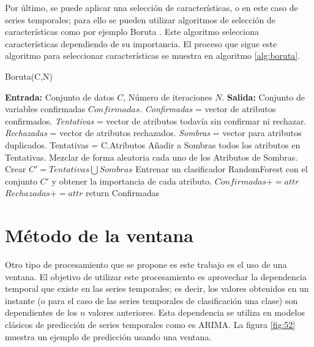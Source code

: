 Por último, se puede aplicar una selección de características, o en este caso de series temporales; para ello se pueden utilizar algoritmos de selección de características como por ejemplo Boruta \cite{kursa2010boruta}. Este algoritmo selecciona características dependiendo de su importancia. El proceso que sigue este algoritmo para seleccionar características se muestra en algoritmo \ref{alg:boruta}.\newline

\begin{algorithm}[H]
	\caption{Boruta(C,N)}
	\label{alg:boruta}
	\begin{algorithmic}[0]
		\State \textbf{Entrada:} Conjunto de datos $C$, Número de iteraciones $N$.
		\State \textbf{Salida:} Conjunto de variables confirmadas $Confirmadas$.
		\State \textit{Confirmadas} = vector de atributos confirmados.
		\State \textit{Tentativas} = vector de atributos todavía sin confirmar ni rechazar.
		\State \textit{Rechazadas} = vector de atributos rechazados.
		\State \textit{Sombras} = vector para atributos duplicados.
		\State Tentativas = C.Atributos
			\State Añadir a Sombras todos los atributos en Tentativas.
			\State Mezclar de forma aleatoria cada uno de los Atributos de Sombras.
			\State Crear $C' = Tentativas \bigcup Sombras$
			\State Entrenar un clasificador RandomForest con el conjunto $C'$ y obtener la importancia de cada atributo.
					\State $Confirmadas += attr$
				\Else
					\State $Rechazadas += attr$
				\EndIf
			\EndFor
		\EndFor
		\State return Confirmadas
	\end{algorithmic}
\end{algorithm}

\section{Método de la ventana}
Otro tipo de procesamiento que se propone es este trabajo es el uso de una ventana. El objetivo de utilizar este procesamiento es aprovechar la dependencia temporal que existe en las series temporales; es decir, los valores obtenidos en un instante (o para el caso de las series temporales de clasificación una clase) son dependientes de los $n$ valores anteriores.\newline
\newpage
Esta dependencia se utiliza en modelos clásicos de predicción de series temporales como es ARIMA. La figura \ref{fig:52} muestra un ejemplo de predicción usando una ventana.\newline

